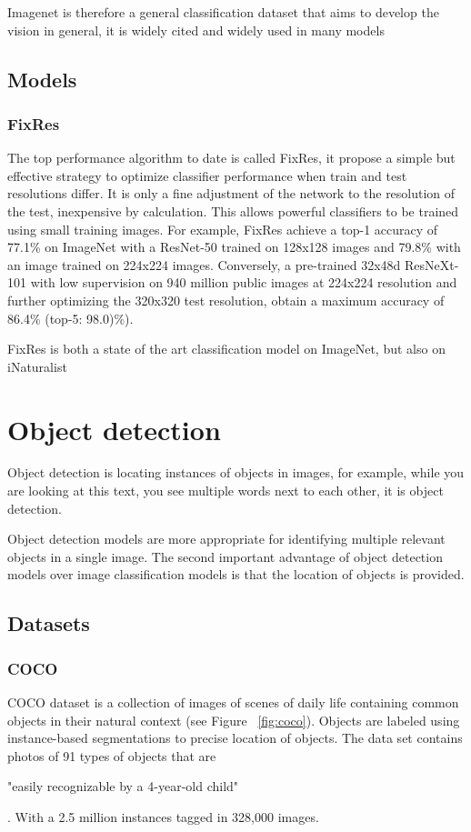 Imagenet is therefore a general classification dataset that aims to develop the vision in general, it is widely cited and widely used in many models

\pagebreak\subsection{Models}
\subsubsection{FixRes}
The top performance algorithm to date is called FixRes\cite{2019arXivFixRes}, it propose a simple but effective strategy to optimize classifier performance when train and test resolutions differ. It is only a fine adjustment of the network to the resolution of the test, inexpensive by calculation. This allows powerful classifiers to be trained using small training images. For example, FixRes achieve a top-1 accuracy of 77.1\% on ImageNet with a ResNet-50 trained on 128x128 images and 79.8\% with an image trained on 224x224 images.
Conversely, a pre-trained 32x48d ResNeXt-101 with low supervision on 940 million public images at 224x224 resolution and further optimizing the 320x320 test resolution, obtain a maximum accuracy of 86.4\% (top-5: 98.0)\%). 

FixRes is both a state of the art classification model on ImageNet\cite{pwc_classification_imagenet}, but also on iNaturalist\cite{pwc_classification_inaturalist}

\pagebreak\section{Object detection}
Object detection is locating instances of objects in images, for example, while you are looking at this text, you see multiple words next to each other, it is object detection.

Object detection models are more appropriate for identifying multiple relevant objects in a single image. The second important advantage of object detection models over image classification models is that the location of objects is provided.

\subsection{Datasets}
\subsubsection{COCO}
COCO\cite{coco} dataset is a collection of images of scenes of daily life containing common objects in their natural context (see Figure ~\ref{fig:coco}). Objects are labeled using instance-based segmentations to precise location of objects. The data set contains photos of 91 types of objects that are \begin{it}"easily recognizable by a 4-year-old child"\end{it}. With a 2.5 million instances tagged in 328,000 images.

